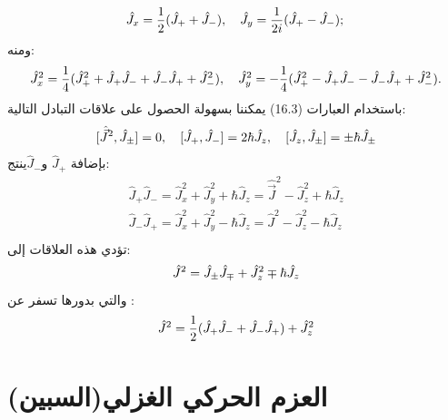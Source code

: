 \begin{equation}
	 \hat{J}_x=\frac{1}{2}(\hat{J}_{+}+\hat{J}_{-}), \quad \hat{J}_y=\frac{1}{2 i}(\hat{J}_{+}-\hat{J}_{-}) ; \\
\end{equation}
ومنه:
\begin{equation}
 \hat{J}_x^2=\frac{1}{4}(\hat{J}_{+}^2+\hat{J}_{+} \hat{J}_{-}+\hat{J}_{-} \hat{J}_{+}+\hat{J}_{-}^2), \quad \hat{J}_y^2=-\frac{1}{4}(\hat{J}_{+}^2-\hat{J}_{+} \hat{J}_{-}-\hat{J}_{-} \hat{J}_{+}+\hat{J}_{-}^2) . \\
\end{equation}
باستخدام العبارات (16.3) يمكننا بسهولة الحصول على علاقات التبادل التالية:
\begin{equation}
	 {[\hat{\vec{J}}^2, \hat{J}_{ \pm}]=0, \quad[\hat{J}_{+}, \hat{J}_{-}]=2 \hbar \hat{J}_z, \quad[\hat{J}_z, \hat{J}_{ \pm}]= \pm \hbar \hat{J}_{ \pm} } \\
\end{equation}
بإضافة $\hat{J}_{+}$ و$ \hat{J}_{-}$ينتج:
\begin{equation}
	\begin{aligned}
		 \hat{J}_{+} \hat{J}_{-}=\hat{J}_x^2+\hat{J}_y^2+\hbar \hat{J}_z=\hat{\vec{J}}^2-\hat{J}_z^2+\hbar \hat{J}_z\\
		 \hat{J}_{-} \hat{J}_{+}=\hat{J}_x^2+\hat{J}_y^2-\hbar \hat{J}_z=\hat{J}^2-\hat{J}_z^2-\hbar \hat{J}_z \\
	\end{aligned}
\end{equation}
تؤدي هذه العلاقات إلى:
\begin{equation}
	 \hat{J}^2=\hat{J}_{ \pm} \hat{J}_{\mp}+\hat{J}_z^2 \mp \hbar \hat{J}_z \\
\end{equation}
والتي بدورها تسفر عن :
\begin{equation}
	\hat{J}^2=\frac{1}{2}(\hat{J}_{+} \hat{J}_{-}+\hat{J}_{-} \hat{J}_{+})+\hat{J}_z^2  \\
\end{equation}
\section{العزم الحركي الغزلي(السبين)}

